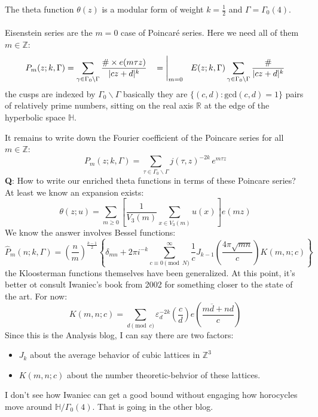 \documentclass[12pt]{article}
\begin{document}
The theta function $\theta(z)$ is a  modular form of weight $k = \frac{1}{2}$ and $\Gamma = \Gamma_0(4)$. \\ \\
Eisenstein series are the $m = 0$ case of Poincar\'{e} series.  Here we need all of them $m \in \mathbb{Z}$:
$$ P_m(z; k , \Gamma) =   \sum_{\gamma \in \Gamma_0 \backslash \Gamma } \frac{\# \times e(m \tau z)}{|cz+d|^k} \hspace{0.125in} = \Bigg|_{m=0} \hspace{0.125in} E(z; k ,\Gamma)  \sum_{\gamma \in \Gamma_0 \backslash \Gamma }  \frac{\#}{|cz+d|^k} $$
the cusps are indexed by $\Gamma_0 \backslash \Gamma$ basically they are $\{ (c,d) : \mathrm{gcd}(c,d) = 1 \}$ pairs of relatively prime numbers, sitting on the real axis $\mathbb{R}$ at the edge of the hyperbolic space $\mathbb{H}$.

\newpage \noindent It remains to write down the Fourier coefficient of the Poincare series for all $m \in \mathbb{Z}$:
$$ P_m( z; k , \Gamma) = \sum_{\tau \in \Gamma_0 \backslash \Gamma } j(\tau, z)^{-2k} \, e^{m\tau z} $$
\textbf{Q}: How to write our enriched theta functions in terms of these Poincare series?  At least we know an expansion exists:
$$ \theta(z; u) = \sum_{m \geq 0} \left[ \frac{1}{V_3(m)} \sum_{x \in V_3(m)} u(x)  \right]  e(mz) $$
We know the answer involves Bessel functions:
$$ \widehat{P}_m (n; k , \Gamma) = \left( \frac{n}{m} \right)^{\frac{k-1}{2}} 
\left\{  \delta_{mn} + 2\pi i^{-k} \sum_{c \equiv 0 \pmod N}^\infty \frac{1}{c}
J_{k-1} \left( \frac{4\pi \sqrt{mn}}{c}\right) K(m,n; c) \right\} $$
the Kloosterman functions themselves have been generalized.  At this point, it's better ot consult Iwaniec's book from 2002 for something closer to the state of the art.  For now:
$$ K(m,n;c) = \sum_{d \pmod c} \varepsilon_d^{-2k} \left( \frac{c}{d} \right) e \left(  \frac{m \overline{d} +  n d}{c} \right) $$
Since this is the Analysis blog, I can say there are two factors:
\begin{itemize}
\item $J_k$ about the average behavior of cubic lattices in $\mathbb{Z}^3$
\item $K(m,n;c)$ about the number theoretic-behvior of these lattices.
\end{itemize}
I don't see how Iwaniec can get a good bound without engaging how horocycles move around $\mathbb{H}/\Gamma_0(4)$.  That is going in the other blog. 
\end{document}
